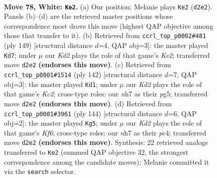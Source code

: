 \documentclass[11pt]{article}
\begin{document}
\clearpage

\begin{figure}[p]\centering
\begin{subfigure}{0.46\textwidth}\centering
\resizebox{\linewidth}{!}{%
\newchessgame
\chessboard[
  setfen={8/7n/3k4/P7/8/7r/3K4/6R1 w - - 3 78},
  showmover=false,
  pgfstyle=straightmove, color=movearrow, markmove={d2-e2}
]}
\caption{}
\end{subfigure}\hfill
\begin{subfigure}{0.46\textwidth}\centering
\resizebox{\linewidth}{!}{%
\newchessgame
\chessboard[
  setfen={8/4k3/2R5/4p3/6K1/8/1rN5/8 b - - 0 75},
  showmover=false,
  pgfstyle=straightmove, color=movearrow, markmove={e7-d7}
]}
\caption{}
\end{subfigure}
\\[4pt]
\begin{subfigure}{0.46\textwidth}\centering
\resizebox{\linewidth}{!}{%
\newchessgame
\chessboard[
  setfen={5R2/8/8/6pP/4k3/6r1/2K5/8 w - - 10 72},
  showmover=false,
  pgfstyle=straightmove, color=movearrow, markmove={c2-d1}
]}
\caption{}
\end{subfigure}\hfill
\begin{subfigure}{0.46\textwidth}\centering
\resizebox{\linewidth}{!}{%
\newchessgame
\chessboard[
  setfen={1R6/2r5/5K2/7P/2p5/4k3/8/8 w - - 12 73},
  showmover=false,
  pgfstyle=straightmove, color=movearrow, markmove={f6-g5}
]}
\caption{}
\end{subfigure}
\caption{\textbf{Move 78, White: \texttt{Ke2}.} (a) Our position; Melanie plays \texttt{Ke2} (\texttt{d2e2}). Panels (b)--(d) are the retrieved master positions whose correspondence most drove this move (highest QAP objective among those that transfer to it). (b) Retrieved from \texttt{ccrl\_top\_p0002\#481} (ply 149) [structural distance $d$=4, QAP obj=3]: the master played \texttt{Kd7}; under $\mu$ our \emph{Kd2} plays the role of that game's \emph{Ke2}; transferred move \texttt{d2e2} \textbf{(endorses this move)}. (c) Retrieved from \texttt{ccrl\_top\_p0001\#1514} (ply 142) [structural distance $d$=7, QAP obj=3]: the master played \texttt{Kd1}; under $\mu$ our \emph{Kd2} plays the role of that game's \emph{Kc2}; cross-type roles: our \emph{n}h7 as their \emph{p}g5; transferred move \texttt{d2e2} \textbf{(endorses this move)}. (d) Retrieved from \texttt{ccrl\_top\_p0001\#3961} (ply 144) [structural distance $d$=6, QAP obj=2]: the master played \texttt{Kg5}; under $\mu$ our \emph{Kd2} plays the role of that game's \emph{Kf6}; cross-type roles: our \emph{n}h7 as their \emph{p}c4; transferred move \texttt{d2e2} \textbf{(endorses this move)}. Synthesis: 22 retrieved analogs transferred to \texttt{Ke2} (summed QAP objective 32, the strongest correspondence among the candidate moves); Melanie committed it via the \texttt{search} selector.}
\label{fig:thought-m154}
\end{figure}
\end{document}
